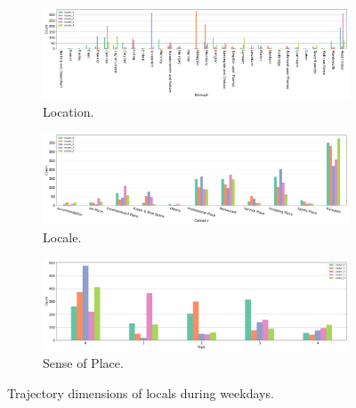 \documentclass{article}
\theoremstyle{definition}
\theoremstyle{remark}
\begin{document}
\begin{figure}[!h]

\centering
\begin{subfigure}{0.6\textheight}
\centering
\includegraphics[width=1\linewidth]{figures/traj_location_weekday_locals.png}
\caption{Location.}
\label{fig:traj_location_weekday_locals}
\end{subfigure}
\begin{subfigure}{0.6\textheight}
\centering
\includegraphics[width=1\linewidth]{figures/traj_locale_weekday_locals.png}
\caption{Locale.}
\label{fig:traj_locale_weekday_locals}
\end{subfigure}
\begin{subfigure}{0.6\textheight}
\centering
\includegraphics[width=1\linewidth]{figures/traj_sense_weekday_locals.png}
\caption{Sense of Place.}
\label{fig:traj_sense_weekday_locals}
\end{subfigure}

\caption{Trajectory dimensions of locals during weekdays.}
\label{fig:traj_dimension_weekday_locas}
\end{figure}
\end{document}
